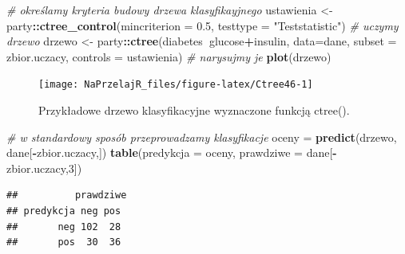 \documentclass[polish,]{book}
\newenvironment{Shaded}{\begin{snugshade}}{\end{snugshade}}
\newcommand{\CommentTok}[1]{\textcolor[rgb]{0.56,0.35,0.01}{\textit{#1}}}
\newcommand{\DataTypeTok}[1]{\textcolor[rgb]{0.13,0.29,0.53}{#1}}
\newcommand{\DecValTok}[1]{\textcolor[rgb]{0.00,0.00,0.81}{#1}}
\newcommand{\FloatTok}[1]{\textcolor[rgb]{0.00,0.00,0.81}{#1}}
\newcommand{\KeywordTok}[1]{\textcolor[rgb]{0.13,0.29,0.53}{\textbf{#1}}}
\newcommand{\NormalTok}[1]{#1}
\newcommand{\OperatorTok}[1]{\textcolor[rgb]{0.81,0.36,0.00}{\textbf{#1}}}
\newcommand{\StringTok}[1]{\textcolor[rgb]{0.31,0.60,0.02}{#1}}
\begin{document}
\begin{Shaded}
\begin{Highlighting}[]
\CommentTok{# określamy kryteria budowy drzewa klasyfikayjnego}
\NormalTok{ustawienia <-}\StringTok{ }\NormalTok{party}\OperatorTok{::}\KeywordTok{ctree_control}\NormalTok{(}\DataTypeTok{mincriterion =} \FloatTok{0.5}\NormalTok{, }\DataTypeTok{testtype =} \StringTok{"Teststatistic"}\NormalTok{)}
\CommentTok{# uczymy drzewo}
\NormalTok{drzewo <-}\StringTok{ }\NormalTok{party}\OperatorTok{::}\KeywordTok{ctree}\NormalTok{(diabetes}\OperatorTok{~}\NormalTok{glucose}\OperatorTok{+}\NormalTok{insulin,}
                       \DataTypeTok{data=}\NormalTok{dane, }\DataTypeTok{subset =}\NormalTok{ zbior.uczacy, }\DataTypeTok{controls =}\NormalTok{ ustawienia)}
\CommentTok{# narysujmy je}
\KeywordTok{plot}\NormalTok{(drzewo)}
\end{Highlighting}
\end{Shaded}

\begin{figure}[h]

{\centering \texttt{[image: NaPrzelajR\_files/figure-latex/Ctree46-1]} 

}

\caption{Przykładowe drzewo klasyfikacyjne wyznaczone funkcją ctree().}\label{fig:Ctree46}
\end{figure}

\begin{Shaded}
\begin{Highlighting}[]
\CommentTok{# w standardowy sposób przeprowadzamy klasyfikacje}
\NormalTok{oceny =}\StringTok{ }\KeywordTok{predict}\NormalTok{(drzewo, dane[}\OperatorTok{-}\NormalTok{zbior.uczacy,])}
\KeywordTok{table}\NormalTok{(}\DataTypeTok{predykcja =}\NormalTok{ oceny, }\DataTypeTok{prawdziwe =}\NormalTok{ dane[}\OperatorTok{-}\NormalTok{zbior.uczacy,}\DecValTok{3}\NormalTok{])}
\end{Highlighting}
\end{Shaded}

\begin{verbatim}
##          prawdziwe
## predykcja neg pos
##       neg 102  28
##       pos  30  36
\end{verbatim}
\end{document}
